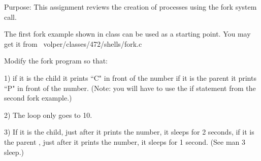 

\parindent 0pt

Purpose: This assignment reviews the creation of processes using
the fork system call.

The first fork example shown in class can be used as a starting point.
You may get it from 
\hfill\break
{\ltt{}~volper/classes/472/shells/fork.c}

Modify the fork program so that:

1) if it is the child it prints ``C" in front of the number
if it is the parent it prints ``P" in front of the number.
(Note: you will have to use the if statement from the second fork
example.)

2) The loop only goes to 10.

3) If it is the child, just after it prints the number, it sleeps for 2 seconds,
if it is the parent , just after it prints the number, it sleeps for 1 second.
(See {\ltt{}man 3 sleep}.)

\bye
